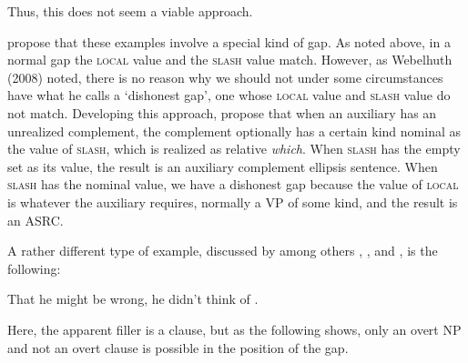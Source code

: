 \documentclass[output=paper
                ,modfonts
                ,nonflat
	        ,collection
	        ,collectionchapter
	        ,collectiontoclongg
 	        ,biblatex
                ,babelshorthands
                ,newtxmath
                ,draftmode
                ,colorlinks, citecolor=brown
]{./langsci/langscibook}
\begin{document}
{\begin{exe} \ex \begin{xlist} 

\end{xlist}
\end{exe}
\noindent
\begin{exe} \ex \begin{xlist} 

\end{xlist}
\end{exe}

\noindent
Thus, this does not seem a viable approach.

\citet{Arnold:Borsley:10} propose that these examples involve a special
kind of gap. As noted above, in a normal gap the \textsc{local} value and the
\textsc{slash} value match. However, as Webelhuth (2008) noted, there is no
reason why we should not under some circumstances have what he calls a
`dishonest gap', one whose \textsc{local} value and \textsc{slash} value do not match.
Developing this approach, \citet{Arnold:Borsley:10} propose that when an
auxiliary has an unrealized complement, the complement optionally has a
certain kind nominal as the value of \textsc{slash}, which is realized as
relative \emph{which}. When \textsc{slash} has the empty set as its value, the
result is an auxiliary complement ellipsis sentence. When \textsc{slash} has the
nominal value, we have a dishonest gap because the value of \textsc{local} is
whatever the auxiliary requires, normally a VP of some kind, and the
result is an ASRC.

A rather different type of example, discussed by among others
\citet{Bresnan01}, \citet{Bouma:Malouf:Sag:01}, and \citet{Webelhuth:12},
is the following:

\begin{exe}
\ex  \label{ex:UDC:ThatHeMightBeWrong}  That he might be wrong, he didn't think of \gap{}.
\end{exe}

\noindent
Here, the apparent filler is a clause, but as the following shows, only
an overt NP and not an overt clause is possible in the position of the
gap.

\begin{exe}
\ex
\begin{xlist}
\end{xlist}
\end{exe}

}
\end{document}
